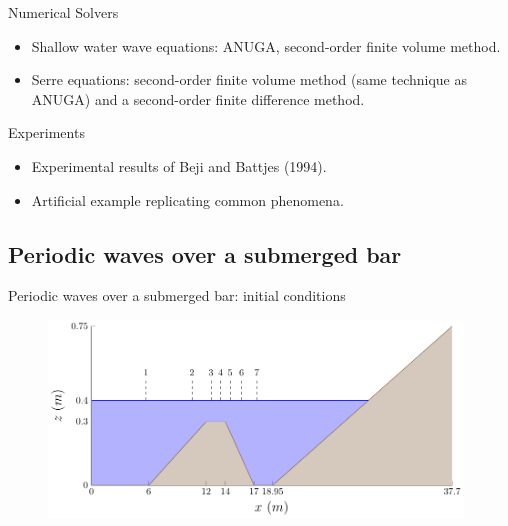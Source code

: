 \documentclass[pdf]{beamer}
\begin{document}
\begin{frame}
	Numerical Solvers
	\begin{itemize}
		\item Shallow water wave equations: ANUGA, second-order finite volume method.
		\item Serre equations: second-order finite volume method (same technique as ANUGA) and a second-order finite difference method.
	\end{itemize}
	\bigskip
	Experiments
	\begin{itemize}
		\item Experimental results of Beji and Battjes (1994).
		\item Artificial example replicating common phenomena.
	\end{itemize}
\end{frame}

\subsection{Periodic waves over a submerged bar}
\begin{frame}{Periodic waves over a submerged bar: initial conditions}
		\begin{figure}
			\includegraphics[width=11cm]{./Pics/WT.pdf}
		\end{figure}
\end{frame}
\end{document}
